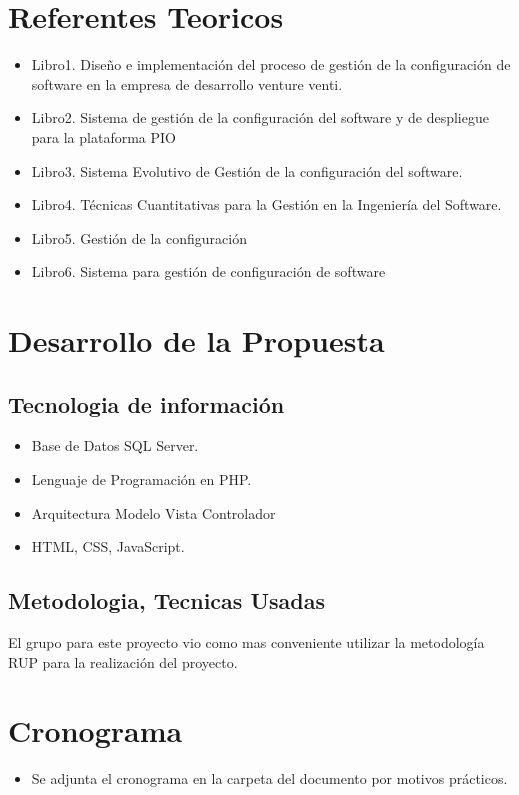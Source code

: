 \documentclass[twoside,twocolumn]{article}
\begin{document}
\section{Referentes Teoricos}
\begin{itemize}
	\item Libro1. Diseño e implementación del proceso de gestión de la configuración de software en la empresa de desarrollo venture venti.
	\item Libro2. Sistema de gestión de la configuración del software y de despliegue para la plataforma PIO
	\item Libro3. Sistema Evolutivo de Gestión de la configuración del software.
	\item Libro4. Técnicas Cuantitativas para la Gestión en la Ingeniería del Software.
	\item Libro5. Gestión de la configuración
	\item Libro6. Sistema para gestión de configuración de software
	
	
\end{itemize}
\section{Desarrollo de la Propuesta}
\subsection{Tecnologia de información }
\begin{itemize}
	\item Base de Datos SQL Server.
	\item Lenguaje de Programación en PHP.
	\item Arquitectura Modelo Vista Controlador
	\item HTML, CSS, JavaScript.	
	
	
\end{itemize}
\subsection{Metodologia, Tecnicas Usadas }
El grupo para este proyecto vio como mas conveniente utilizar la metodología RUP para la realización del proyecto.
\section{Cronograma}
\begin{itemize}
\item Se adjunta el cronograma en la carpeta del documento por motivos prácticos.


\end{itemize}
\end{document}
